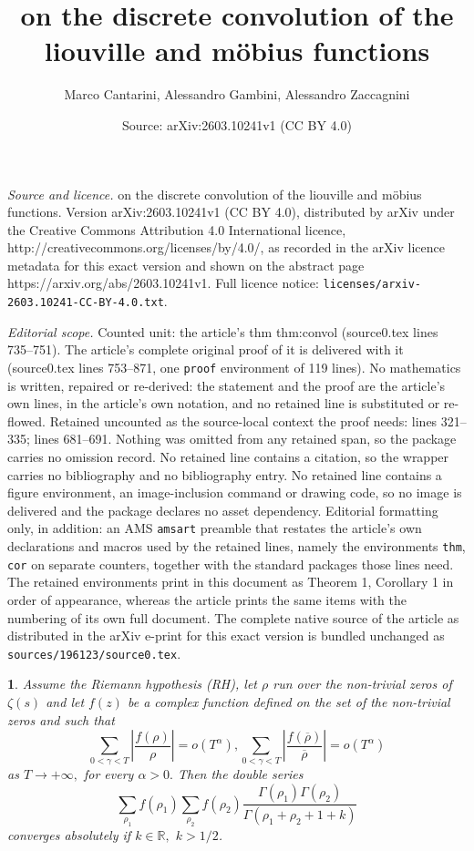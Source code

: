 \documentclass[10pt,a4paper]{amsart}
\title{on the discrete convolution of the liouville and m\"obius functions}
\author{Marco Cantarini, Alessandro Gambini, Alessandro Zaccagnini}
\date{Source: arXiv:2603.10241v1 (CC BY 4.0)}
\newtheorem{thm}{}
\begin{document}
\maketitle

\noindent\emph{Source and licence.} on the discrete convolution of the liouville and m\"obius functions. Version arXiv:2603.10241v1 (CC BY 4.0), distributed by arXiv under the Creative Commons Attribution 4.0 International licence, http://creativecommons.org/licenses/by/4.0/, as recorded in the arXiv licence metadata for this exact version and shown on the abstract page https://arxiv.org/abs/2603.10241v1. Full licence notice: \texttt{licenses/arxiv-2603.10241-CC-BY-4.0.txt}.\par\smallskip

\noindent\textit{Editorial scope.} Counted unit: the article's thm thm:convol (source0.tex lines 735--751). The article's complete original proof of it is delivered with it (source0.tex lines 753--871, one \texttt{proof} environment of 119 lines). No mathematics is written, repaired or re-derived: the statement and the proof are the article's own lines, in the article's own notation, and no retained line is substituted or re-flowed.  Retained uncounted as the source-local context the proof needs: lines 321--335; lines 681--691.  Nothing was omitted from any retained span, so the package carries no omission record.  No retained line contains a citation, so the wrapper carries no bibliography and no bibliography entry.  No retained line contains a figure environment, an image-inclusion command or drawing code, so no image is delivered and the package declares no asset dependency.  Editorial formatting only, in addition: an AMS \texttt{amsart} preamble that restates the article's own declarations and macros used by the retained lines, namely the environments \texttt{thm}, \texttt{cor} on separate counters, together with the standard packages those lines need.  The retained environments print in this document as Theorem 1, Corollary 1 in order of appearance, whereas the article prints the same items with the numbering of its own full document.  The complete native source of the article as distributed in the arXiv e-print for this exact version is bundled unchanged as \texttt{sources/196123/source0.tex}.
\begin{thm}
\label{thm:double ser}Assume the Riemann hypothesis (RH), let $\rho$
run over the non-trivial zeros of $\zeta(s)$ and let $f(z)$ be a
complex function defined on the set of the
non-trivial zeros and such that
\[
\sum_{0<\gamma<T}\left|\frac{f\left(\rho\right)}{\rho}\right|=o\left(T^{\alpha}\right),\sum_{0<\gamma<T}\left|\frac{f\left(\overline{\rho}\right)}{\overline{\rho}}\right|=o\left(T^{\alpha}\right)
\]
as $T\rightarrow+\infty,$ for every $\alpha>0.$ Then the double
series
\[
\sum_{\rho_{1}}f\left(\rho_{1}\right)\sum_{\rho_{2}}f\left(\rho_{2}\right)\frac{\Gamma\left(\rho_{1}\right)\Gamma\left(\rho_{2}\right)}{\Gamma\left(\rho_{1}+\rho_{2}+1+k\right)}
\]
converges absolutely if $k\in\mathbb{R},$ $k>1/2$.
\end{thm}
\end{document}
